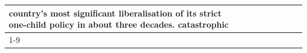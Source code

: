 \begin{table}[H]
\begin{tabular}{lllrlllll}
country's most significant liberalisation of its strict one-child policy in about three decades. catastrophic \\
\cline{1-9}
\bottomrule
\end{tabular}
\end{table}
